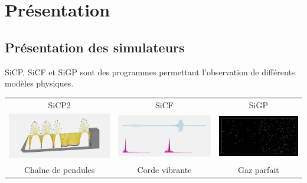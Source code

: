 \chapter{Présentation}
%

\section{Présentation des simulateurs}
%
SiCP, SiCF et SiGP sont des programmes permettant l'observation de différents modèles physiques.
\begin{center}
\renewcommand{\arraystretch}{1.1}
\begin{tabular}{ccc}%
SiCP2  & SiCF & SiGP \\
\includegraphics[scale=0.157]{./illustration/SiCP2} & \includegraphics[scale=0.157]{./illustration/SiCF} & \includegraphics[scale=0.157]{./illustration/SiGP} \\
Chaîne de pendules  & Corde vibrante & Gaz parfait \\
\end{tabular}
\end{center}
